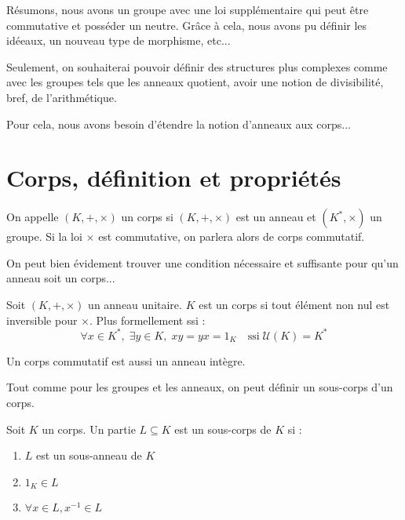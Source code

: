 
\minitoc  %

Résumons, nous avons un groupe avec une loi supplémentaire qui peut être commutative et posséder un neutre. 
Grâce à cela, nous avons pu définir les idéeaux, un nouveau type de morphisme, etc... 

Seulement, on souhaiterai pouvoir définir des structures plus complexes comme avec les groupes tels que les anneaux 
quotient, avoir une notion de divisibilité, bref, de l'arithmétique. 

Pour cela, nous avons besoin d'étendre la notion d'anneaux aux corps...


\section{Corps, définition et propriétés}

\begin{definition}[Corps]
    On appelle $(K, +, \times)$ un corps si $(K,+,\times)$ est un anneau et $(K^*, \times)$ un groupe. 
    Si la loi $\times$ est commutative, on parlera alors de corps commutatif. 
\end{definition}

On peut bien évidement trouver une condition nécessaire et suffisante pour qu'un anneau soit un corps...

\begin{proposition}
    Soit $(K, +, \times)$ un anneau unitaire. $K$ est un corps si tout élément non nul est inversible pour $\times$. 
    Plus formellement ssi : 
        \[ \forall x \in K^*, \; \exists y \in K, \; xy = yx = 1_K \quad \text{ssi} \; \mathcal{U}(K) = K^*\] 
\end{proposition}

\begin{proposition}
    Un corps commutatif est aussi un anneau intègre. 
\end{proposition}

Tout comme pour les groupes et les anneaux, on peut définir un sous-corps d'un corps. 

\newpage 

\begin{definition}
    Soit $K$ un corps. Un partie $L \subseteq K$ est un sous-corps de $K$ si :
    \begin{enumerate}[label=\roman*)]
        \item $L$ est un sous-anneau de $K$
        \item $1_K \in L$ 
        \item $ \forall x \in L, x^{-1} \in L$
    \end{enumerate}
\end{definition}

